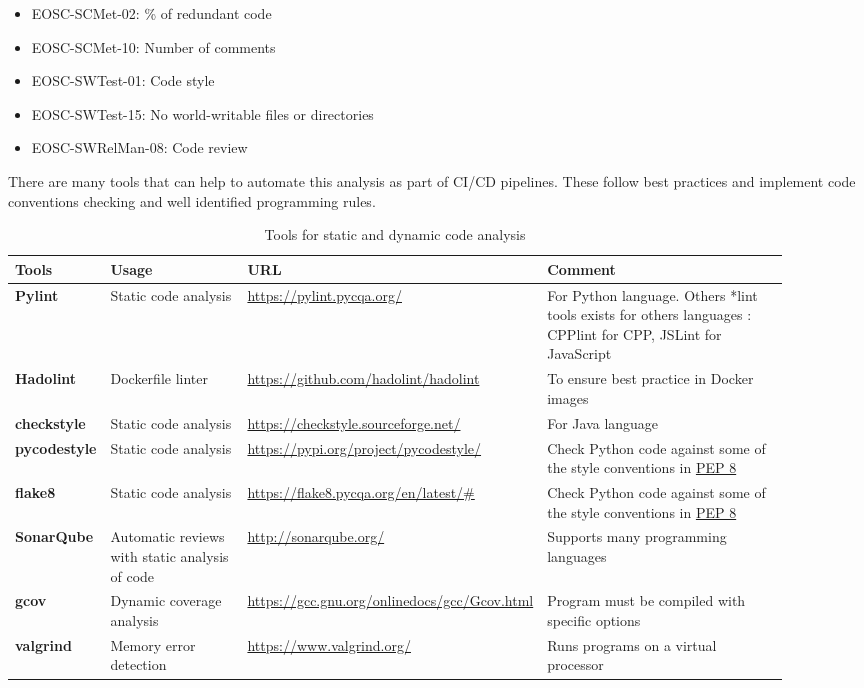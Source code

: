 \begin{itemize}
  \item EOSC-SCMet-02: \% of redundant code
  \item EOSC-SCMet-10: Number of comments
  \item EOSC-SWTest-01: Code style
  \item EOSC-SWTest-15: No world-writable files or directories
  \item EOSC-SWRelMan-08: Code review
\end{itemize}

There are many tools that can help to automate this analysis as part of CI/CD pipelines. These follow best practices and implement code conventions checking and well identified programming rules.

\begin{table}[h]
  \centering
  \scriptsize
  \begin{tabular}{|p{0.08\linewidth}|p{0.18\linewidth}|p{0.32\linewidth}|p{0.32\linewidth}|} \hline

    \textbf{Tools} & \textbf{Usage} & \textbf{URL} & \textbf{Comment} \\ \hline \hline
    \textbf{Pylint} & Static code analysis & \url{https://pylint.pycqa.org/} & For Python language. Others *lint tools exists for others languages : CPPlint for CPP, JSLint for JavaScript \\ \hline
    \textbf{Hadolint} & Dockerfile linter & \url{https://github.com/hadolint/hadolint} & To ensure best practice in Docker images \\ \hline
    \textbf{checkstyle} & Static code analysis & \url{https://checkstyle.sourceforge.net/} & For Java language  \\ \hline
    \textbf{pycodestyle} & Static code analysis & \url{https://pypi.org/project/pycodestyle/} & Check Python code against some of the style conventions in \href{http://www.python.org/dev/peps/pep-0008/}{PEP 8}  \\ \hline
    \textbf{flake8} & Static code analysis & \url{https://flake8.pycqa.org/en/latest/#} & Check Python code against some of the style conventions in \href{http://www.python.org/dev/peps/pep-0008/}{PEP 8} \\ \hline
    \textbf{SonarQube} & Automatic reviews with static analysis of code & \url{http://sonarqube.org/} & Supports many programming languages  \\ \hline
    \textbf{gcov} & Dynamic coverage analysis & \url{https://gcc.gnu.org/onlinedocs/gcc/Gcov.html} & Program must be compiled with specific options  \\ \hline
    \textbf{valgrind} & Memory error detection & \url{https://www.valgrind.org/} & Runs programs on a virtual processor  \\ \hline

  \end{tabular}
  \caption{Tools for static and dynamic code analysis}
  \label{tab:tools_pack03}
\end{table}

